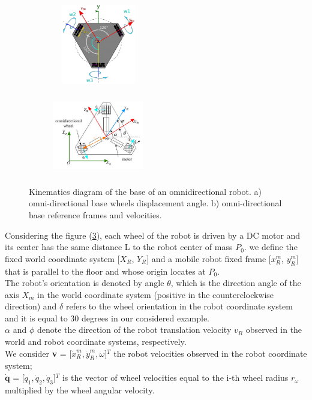 \begin{figure}[H]
  \centering
  \begin{subfigure}[b]{0.4\textwidth}
     \centering
      \includegraphics[draft=false,width=4cm, height=3.5cm]{images/03-foundation/triskarbase1}
	\caption{}
	\label{triskar1} 
  \end{subfigure}
  \begin{subfigure}[b]{0.4\textwidth}
  \centering
      \includegraphics[draft=false,width=4cm, height=3.5cm]{images/03-foundation/triskarbase2}
	\caption{}
	\label{triskar2} 
  \end{subfigure}
  \caption{Kinematics diagram of the base of an omnidirectional robot. a) omni-directional base wheels displacement angle. b) omni-directional base reference frames and velocities.}
\end{figure}

Considering the figure (\ref{triskar2}), each wheel of the robot is driven by a DC motor and its center has the same distance L to the robot center of mass $P_0$. we define the fixed world coordinate system [$X_R$, $Y_R$] and a mobile robot fixed frame [${x}^m_R$, ${y}^m_R$] that is parallel to the floor and whose origin locates at $P_0$.\\
The robot's orientation is denoted by angle $\theta$, which is the direction angle of the axis $X_m$ in the world coordinate system (positive in the
counterclockwise direction) and $\delta$ refers to the wheel orientation in the robot coordinate system and it is equal to 30 degrees in our considered example.
\\
$\alpha$ and $\phi$ denote the direction of the robot translation velocity $v_R$ observed in the world and robot coordinate systems, respectively.\\
We consider \textbf{v} = [$\dot{x}^m_R,\dot{y}^m_R,\omega$]$^T$ the robot velocities observed in the robot coordinate system; \\
$\mathbf{\dot{q}}$ = [$\dot{q}_1,\dot{q}_2,\dot{q}_3$]$^T$ is the vector of wheel velocities equal to the i-th wheel radius $r_\omega$ multiplied by the wheel angular velocity.


